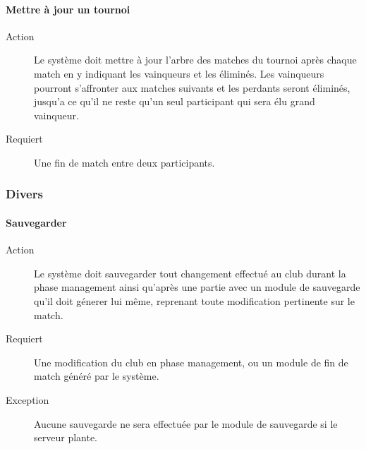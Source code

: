 \documentclass[a4paper]{article}
\begin{document}
\paragraph{Mettre à jour un tournoi}
\begin{description}
\item[Action] Le système doit mettre à jour l'arbre des matches du tournoi après chaque match en y indiquant les vainqueurs et les éliminés. Les vainqueurs pourront s'affronter aux matches suivants et les perdants seront éliminés, jusqu'a ce qu'il ne reste qu'un seul participant qui sera élu grand vainqueur.
\item[Requiert] Une fin de match entre deux participants.
\end{description}

\subsubsection{Divers}
\paragraph{Sauvegarder}
\begin{description}
\item[Action] Le système doit sauvegarder tout changement effectué au \gls{club} durant la phase management ainsi qu'après une partie avec un module de sauvegarde qu'il doit génerer lui même, reprenant toute modification pertinente sur le match.
\item[Requiert] Une modification du \gls{club} en phase management, ou un module de fin de match généré par le système. 
\item[Exception] Aucune sauvegarde ne sera effectuée par le module de sauvegarde si le \gls{serveur} plante.
\end{description}
\end{document}
